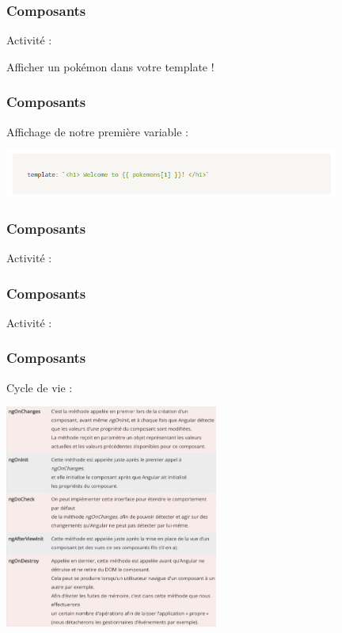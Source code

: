 \documentclass[10pt]{beamer}
\begin{document}
	\begin{frame}
		\frametitle{Composants}

		Activité : \newline \newline

		Afficher un pokémon dans votre template !

	\end{frame}

	\begin{frame}
		\frametitle{Composants}

		Affichage de notre première variable : \newline \newline

		\centering
		\includegraphics[width=11cm]{assets/templateComposant} \newline

	\end{frame}


	\begin{frame}
		\frametitle{Composants}

		Activité : \newline \newline


	\end{frame}

	\begin{frame}
		\frametitle{Composants}

		Activité : \newline \newline


	\end{frame}

	\begin{frame}
		\frametitle{Composants}

		Cycle de vie : \newline

		\centering
		\includegraphics[width=7cm]{assets/vie} \newline


	\end{frame}
\end{document}
